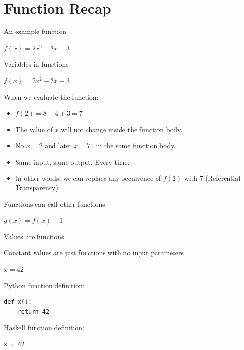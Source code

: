 \documentclass{beamer}
\begin{document}
\section{Function Recap}

\begin{frame}{An example function}

  {\Huge $f(x) = 2x^2 - 2x + 3$}


\end{frame}

\begin{frame}{Variables in functions}

  {\Huge $f(x) = 2x^2 - 2x + 3$}

  \vskip5mm

When we evaluate the function:
  \begin{itemize}[<+->]
    \item $f(2) = 8 - 4 + 3 = 7$
    \item The value of $x$ will not change inside the function body.
    \item No $x = 2$ and later $x = 71$ in the same function body.
    \item Same input, same output. Every time.
    \item In other words, we can replace any occurrence of $f(2)$ with
      $7$ (Referential Transparency)
  \end{itemize}
\end{frame}


\begin{frame}{Functions can call other functions}

  {\Huge $g(x) = f(x) + 1$}

\end{frame}

\begin{frame}[fragile]{Values are functions}

  {\large Constant values are just functions with no input parameters}

  \vskip5mm

  {\Huge $x = 42$}

  \vskip5mm

Python function definition:
  \begin{verbatim}
def x():
    return 42
  \end{verbatim}

Haskell function definition:
  \begin{verbatim}
x = 42
  \end{verbatim}

\end{frame}
\end{document}
